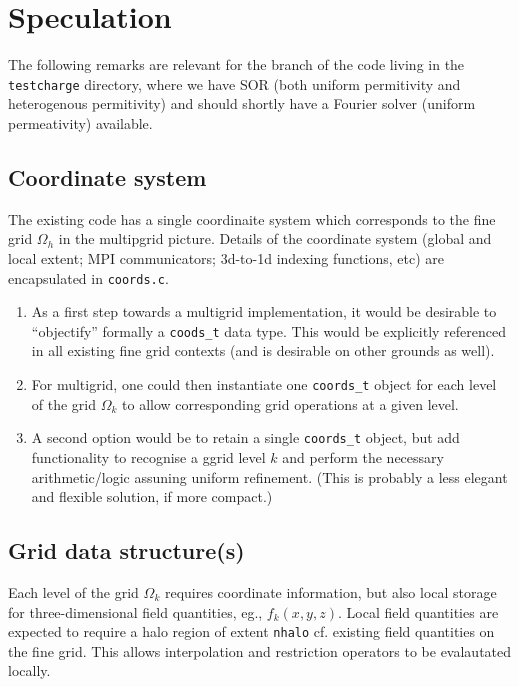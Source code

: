 \documentclass[11pt, oneside, a4paper]{article}
\begin{document}
\section{Speculation}

The following remarks are relevant for the branch of the code living
in the \texttt{testcharge} directory, where we have SOR (both uniform
permitivity and heterogenous permitivity) and should shortly have a
Fourier solver (uniform permeativity) available.

\subsection{Coordinate system}

The existing code has a single coordinaite system which corresponds
to the fine grid $\Omega_h$ in the multipgrid picture. Details of the
coordinate system (global and local extent; MPI communicators; 3d-to-1d
indexing functions, etc) are encapsulated in \texttt{coords.c}.
\begin{enumerate}
\item
As a first step towards a multigrid implementation, it would be
desirable to ``objectify'' formally a \texttt{coods\_t} data type.
This would be explicitly referenced in all existing fine grid
contexts (and is desirable on other grounds as well).
\item
For multigrid, one could then instantiate one \texttt{coords\_t}
object for each level of the grid $\Omega_k$ to allow corresponding
grid operations at a given level.
\item
A second option would be to retain a single \texttt{coords\_t} object,
but add functionality to recognise a ggrid level $k$ and perform the
necessary arithmetic/logic assuning uniform refinement. (This is
probably a less elegant and flexible solution, if more compact.)
\end{enumerate}

\subsection{Grid data structure(s)}

Each level of the grid $\Omega_k$ requires coordinate information,
but also local storage for three-dimensional field quantities, eg.,
$f_k(x,y,z)$. Local field quantities are expected to require a halo
region of extent \texttt{nhalo} cf. existing field quantities on the
fine grid. This allows interpolation and restriction operators to be
evalautated locally.
\end{document}
